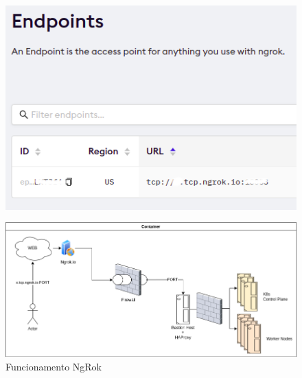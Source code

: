 \documentclass[10pt,brazil]{beamer}
\theoremstyle{definition}
\begin{document}
\begin{frame}[plain]
  \hspace*{-10mm}
  \begin{figure}
    \centering  
  \includegraphics[width=0.5\paperwidth]{ngrok.png}
\end{figure}
\end{frame}

\begin{frame}[plain]
  \hspace*{-10mm}
  \begin{figure}
    \includegraphics[width=.85\paperwidth]{ngroktcp.png}
  \caption[Funcionamnto NgRok]{Funcionamento NgRok}
  \end{figure}
\end{frame}


\end{document}
